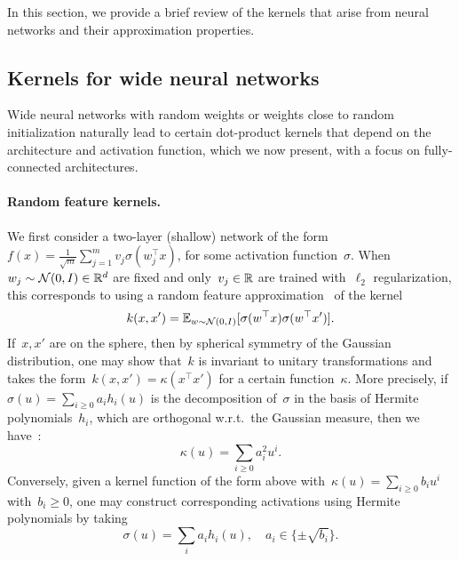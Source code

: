 
In this section, we provide a brief review of the kernels that arise from neural networks and their approximation properties.


\subsection{Kernels for wide neural networks}
\label{sub:nn_kernels}

Wide neural networks with random weights or weights close to random initialization naturally lead to certain dot-product kernels that depend on the architecture and activation function, which we now present,
with a focus on fully-connected architectures.

\paragraph{Random feature kernels.}
We first consider a two-layer (shallow) network of the form $f(x) = \frac{1}{\sqrt{m}}\sum_{j=1}^m v_j \sigma(w_j^\top x)$, for some activation function~$\sigma$.
When~$w_j \sim \mathcal N(0, I) \in {\mathbb R}^d$ are fixed and only~$v_j \in {\mathbb R}$ are trained with~$\ell_2$ regularization, this corresponds to using a random feature approximation~\cite{rahimi2007} of the kernel
\begin{equation}
\label{eq:rf_kernel}
k(x, x') = \operatorname{\mathbb{E}}_{w\sim \mathcal N(0, I)}[\sigma(w^\top x) \sigma(w^\top x')].
\end{equation}
If~$x, x'$ are on the sphere, then by spherical symmetry of the Gaussian distribution, one may show that~$k$ is invariant to unitary transformations and takes the form~$k(x, x') = \kappa(x^\top x')$ for a certain function~$\kappa$.
More precisely, if~$\sigma(u) = \sum_{i \geq 0} a_i h_i(u)$ is the decomposition of~$\sigma$ in the basis of Hermite polynomials~$h_i$, which are orthogonal w.r.t.~the Gaussian measure, then we have~\citep{daniely2016toward}:
\begin{equation}
\label{eq:kappa_series}
\kappa(u) = \sum_{i \geq 0} a_i^2 u^i.
\end{equation}
Conversely, given a kernel function of the form above with~$\kappa(u) = \sum_{i \geq 0} b_i u^i$ with~$b_i \geq 0$, one may construct corresponding activations using Hermite polynomials by taking
\begin{equation}
\label{eq:sigma_series}
\sigma(u) = \sum_i a_i h_i(u), \quad a_i \in \{\pm \sqrt{b_i}\}.
\end{equation}
